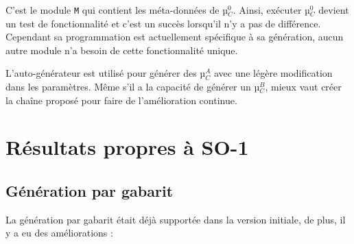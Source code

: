 C'est le module \texttt{M} qui contient les méta-données de µ$_C^0$. Ainsi, exécuter µ$_C^0$ devient un test de fonctionnalité et c'est un succès lorsqu'il n'y a pas de différence. Cependant sa programmation est actuellement spécifique à sa génération, aucun autre module n’a besoin de cette fonctionnalité unique.



L'auto-générateur est utilisé pour générer des µ$_C^A$ avec une légère modification dans les paramètres. Même s'il a la capacité de générer un µ$_C^B$, mieux vaut créer la chaîne proposé pour faire de l'amélioration continue.

\section{Résultats propres à SO-1}

\subsection{Génération par gabarit}

La génération par gabarit était déjà supportée dans la version initiale\cite{bluiksnot_repo}, de plus, il y a eu des améliorations :
